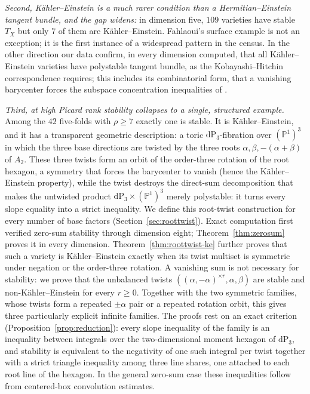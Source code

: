 \documentclass[11pt]{amsart}
\theoremstyle{definition}
\theoremstyle{remark}
\newcommand{\PP}{\mathbb{P}}
\newcommand{\dP}{\mathrm{dP}}
\begin{document}
\emph{Second, K\"ahler--Einstein is a much rarer condition than a
Hermitian--Einstein tangent bundle, and the gap widens:} in dimension
five, $109$ varieties have stable $T_X$ but only $7$ of them are
K\"ahler--Einstein. Fahlaoui's surface example is not an exception; it is
the first instance of a widespread pattern in the census. In the other direction our data
confirm, in every dimension computed, that all K\"ahler--Einstein
varieties have polystable tangent bundle, as the Kobayashi--Hitchin
correspondence requires; this includes its combinatorial form, that a
vanishing barycenter forces the subspace concentration
inequalities of \cite{HNS2022,HenkLinke2014}.

\emph{Third, at high Picard rank stability collapses to a single,
structured example.} Among the $42$ five-folds with $\rho \ge 7$ exactly
one is stable. It is K\"ahler--Einstein, and it has a transparent
geometric description: a toric $\dP_3$-fibration over $(\PP^1)^3$ in
which the three base directions are twisted by the three roots
$\alpha, \beta, -(\alpha+\beta)$ of $A_2$. These three twists form an orbit
of the order-three rotation of the root hexagon, a symmetry that forces the
barycenter to vanish (hence the K\"ahler--Einstein property), while the
twist destroys the direct-sum decomposition that makes the untwisted product
$\dP_3 \times (\PP^1)^3$ merely polystable: it turns every slope equality
into a strict inequality. We define this root-twist construction for every
number of base factors (Section~\ref{sec:roottwist}). Exact computation first
verified zero-sum stability through dimension eight; Theorem~\ref{thm:zerosum}
proves it in every dimension. Theorem~\ref{thm:roottwist-ke} further proves
that such a variety is K\"ahler--Einstein exactly when its twist multiset is
symmetric under negation or the order-three rotation. A
vanishing sum is not necessary for stability: we prove that the unbalanced twists
$((\alpha,-\alpha)^{\times r},\alpha,\beta)$ are stable and
non-K\"ahler--Einstein for every $r\ge0$. Together with the two symmetric
families, whose twists form a repeated $\pm\alpha$ pair or a repeated rotation
orbit, this gives three particularly explicit infinite families. The proofs
rest on an exact criterion (Proposition~\ref{prop:reduction}):
every slope inequality of the family is an inequality between integrals
over the two-dimensional moment hexagon of $\dP_3$, and stability is
equivalent to the negativity of one such integral per twist together
with a strict triangle inequality among three line shares, one attached
to each root line of the hexagon. In the general zero-sum case these
inequalities follow from centered-box convolution estimates.
\end{document}

